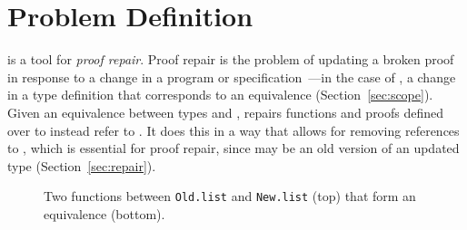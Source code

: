 \section{Problem Definition}
\label{sec:key1}

\toolname is a tool for \textit{proof repair}.
Proof repair is the problem of updating a broken proof in response to a change in a program or specification~\cite{PGL-045, pumpkinpatch}---in the
case of \toolname, a change in a type definition that corresponds to an equivalence (Section~\ref{sec:scope}).
Given an equivalence between types \A and \B,
\toolname repairs functions and proofs defined over \A to instead refer to \B.
It does this in a way that allows for removing references to \A, which is essential for proof repair,
since \A may be an old version of an updated type (Section~\ref{sec:repair}).



\begin{figure*}
\vspace{-0.3cm}
\caption{Two functions between \lstinline{Old.list} and \lstinline{New.list} (top) that form an equivalence (bottom).}
\label{fig:equivalence}
\end{figure*}

